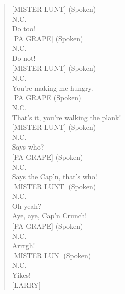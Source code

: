 \documentclass[11pt]{article}
\begin{document}
\begin{verse}
[MISTER LUNT] (Spoken)\\
N.C.\\
Do too!\\
\vspace*{1em}
\vspace*{1em}
[PA GRAPE] (Spoken)\\
N.C.\\
Do not!\\
\vspace*{1em}
\vspace*{1em}
[MISTER LUNT] (Spoken)\\
N.C.\\
You're making me hungry.\\
\vspace*{1em}
\vspace*{1em}
[PA GRAPE (Spoken)\\
N.C.\\
That's it, you're walking the plank!\\
\vspace*{1em}
\vspace*{1em}
[MISTER LUNT] (Spoken)\\
N.C.\\
Says who?\\
\vspace*{1em}
\vspace*{1em}
[PA GRAPE] (Spoken)\\
N.C.\\
Says the Cap'n, that's who!\\
\vspace*{1em}
\vspace*{1em}
[MISTER LUNT] (Spoken)\\
N.C.\\
Oh yeah?\\
Aye, aye, Cap'n Crunch!\\
\vspace*{1em}
\vspace*{1em}
[PA GRAPE] (Spoken)\\
N.C.\\
Arrrgh!\\
\vspace*{1em}
\vspace*{1em}
[MISTER LUN] (Spoken)\\
N.C.\\
Yikes!\\
\vspace*{1em}
\vspace*{1em}
[LARRY]\\

\end{verse}
\end{document}
